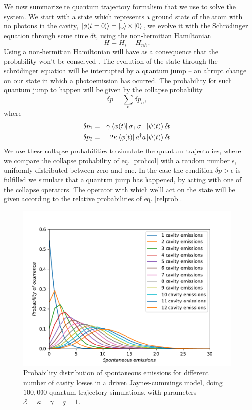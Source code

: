 \documentclass[conference]{IEEEtran}
\begin{document}
We now summarize te quantum trajectory formalism \cite{bla} that we
use to solve the system. We start with a state which represents a
ground state of the atom with no photons in the cavity,
$\ket{\phi(t = 0)} = \ket{\downarrow} \times \ket{0}$, we evolve it
with the Schrödinger equation through some time $\delta t$, using the
non-hermitian Hamiltonian
\begin{equation}
H = H_s +H_{nh}\, .
\end{equation}
Using a non-hermitian Hamiltonian will have as a consequence that the
probability won't be conserved \cite{Sakurai:1167961}. The evolution
of the state through the schrödinger equation will be interrupted by a
quantum jump – an abrupt change on our state in which a photoemission
has ocurred. The probability for such quantum jump to happen will be
given by the collapse probability
\begin{equation} \label{probcol}
\delta p = \sum_n \delta p_n,
\end{equation}
where 
\begin{eqnarray} \label{relprob}
\delta p_1 &=& \gamma \bra{\phi (t)} \sigma_+
               \sigma_-\ket{\psi (t)}\delta t \\
  \delta p_2 &=& 2\kappa \bra{\phi (t)} a^\dagger a\ket{\psi (t)}\delta t 
\end{eqnarray}
We use these collapse probabilities to simulate the quantum
trajectories, where we compare the collapse probability of eq.
\eqref{probcol} with a random number $\epsilon$, uniformly distributed
between zero and one. In the case the condition $\delta p > \epsilon$
is fulfilled we simulate that a quantum jump has happened, by acting
with one of the collapse operators. The operator with which we'll act
on the state will be given according to the relative probabilities of
eq. \eqref{relprob}.
\begin{figure}[!t] 
\centering
\includegraphics[scale = 0.5]{distributioneng.pdf}
\caption{\small{Probability distribution of spontaneous emissions for different number of cavity losses in a driven Jaynes-cummings model, doing $100,000$ quantum trajectory simulations, with parameters $\mathcal{E}  = \kappa = \gamma = g = 1$.}} \label{probdiss}
\end{figure}
\end{document}
